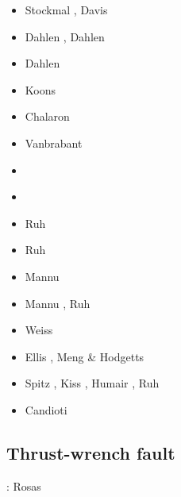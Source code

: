 \begin{scriptsize}
\begin{itemize}
\item[\nineteeneightythree] Stockmal \cite{stoc83}, Davis \etal \cite{dasd83}
\item[\nineteeneightyfour] Dahlen \cite{dahl84}, Dahlen \etal \cite{dasd84}
\item[\nineteenninety] Dahlen \cite{dahl90}
\item[\nineteenninetyfour] Koons \cite{koon94}
\item[\nineteenninetyfour] Chalaron \etal \cite{chmm95} 
\item[\nineteenninetynine] Vanbrabant \etal \cite{vajh99}
\item[\twothousandthree] \cite{wiep03}\cite{smbs03}\cite{muso03}\cite{vamf03}
\item[\twothousandsix] \cite{simp06}\cite{yabm06}
\item[\twothousandtwelve] Ruh \etal \cite{rukb12}
\item[\twothousandthirteen] Ruh \etal \cite{rugb13}
\item[\twothousandsixteen] Mannu \etal \cite{mauw16}
\item[\twothousandseventeen] Mannu \etal \cite{mauw17}, Ruh \etal \cite{rugb17}
\item[\twothousandeighteen] Weiss \etal \cite{weib18}
\item[\twothousandnineteen] Ellis \etal \cite{elgb19}, Meng \& Hodgetts \cite{meho19,meho19b}
\item[\twothousandtwenty] Spitz \etal \cite{spsk20,spbe20}, Kiss \etal \cite{kids20}, 
                          Humair \etal \cite{hube20}, Ruh \cite{ruh20}
\item[\twothousandtwentyone] Candioti \etal \cite{cadm21} 
\end{itemize}
\end{scriptsize}

\subsection{Thrust-wrench fault} 

\begin{scriptsize}
\twothousandfifteen: Rosas \etal \cite{rods15}
\end{scriptsize}


